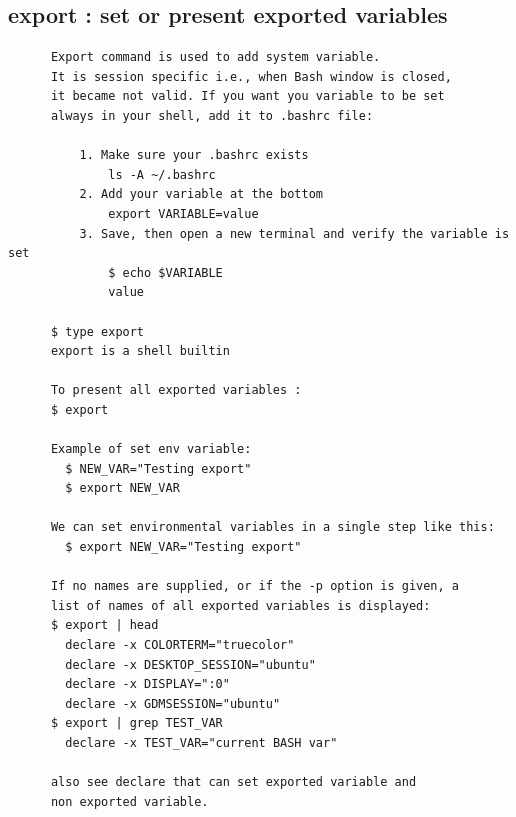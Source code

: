 \documentclass[a4paper,12pt]{article}
\begin{document}
\subsection{export   : set or present exported variables}
\begin{verbatim}
      Export command is used to add system variable. 
      It is session specific i.e., when Bash window is closed, 
      it became not valid. If you want you variable to be set 
      always in your shell, add it to .bashrc file:
      
          1. Make sure your .bashrc exists
		      ls -A ~/.bashrc
          2. Add your variable at the bottom
		      export VARIABLE=value
          3. Save, then open a new terminal and verify the variable is set
		      $ echo $VARIABLE
		      value
      
      $ type export
      export is a shell builtin

      To present all exported variables : 
      $ export
            
      Example of set env variable: 
        $ NEW_VAR="Testing export"
        $ export NEW_VAR      
      
      We can set environmental variables in a single step like this:
        $ export NEW_VAR="Testing export" 
 
      If no names are supplied, or if the -p option is given, a
      list of names of all exported variables is displayed:
      $ export | head
        declare -x COLORTERM="truecolor"
        declare -x DESKTOP_SESSION="ubuntu"
        declare -x DISPLAY=":0"
        declare -x GDMSESSION="ubuntu"
      $ export | grep TEST_VAR
        declare -x TEST_VAR="current BASH var"
       
      also see declare that can set exported variable and 
      non exported variable.
\end{verbatim}
\end{document}
